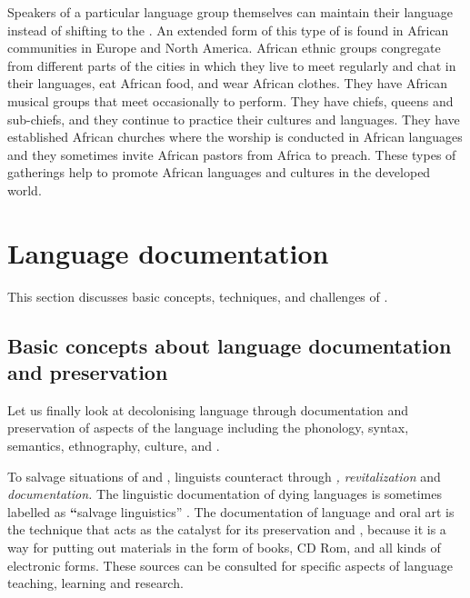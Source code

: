 \documentclass[output=paper,
modfonts
]{langscibook}
\begin{document}
Speakers of a particular language group themselves can maintain their language instead of shifting to the . An extended form of this type of  is found in African communities in Europe and North America. African ethnic groups congregate from different parts of the cities in which they live to meet regularly and chat in their languages, eat African food, and wear African clothes. They have African musical groups that meet occasionally to perform. They have chiefs, queens and sub-chiefs, and they continue to practice their cultures and languages. They have established African churches where the worship is conducted in African languages and they sometimes invite African pastors from Africa to preach. These types of gatherings help to promote African languages and cultures in the developed world.


\section{Language documentation}
\largerpage[1.5]
This section discusses basic concepts, techniques, and challenges of .

\subsection{Basic concepts about language documentation and preservation}

Let us finally look at decolonising language through documentation and preservation of aspects of the language including the phonology, syntax, semantics, ethnography, culture, and . 

To salvage situations of  and , linguists counteract  through \textit{, revitalization }and \textit{documentation. }The linguistic documentation of dying languages is sometimes labelled as \textbf{“}salvage linguistics” \citep[257]{Craig1997}. The documentation of language and oral art is the  technique that acts as the catalyst for its preservation and , because it is a way for putting out materials in the form of books, CD Rom, and all kinds of electronic forms. These sources can be consulted for specific aspects of language teaching, learning and research. 
\end{document}
